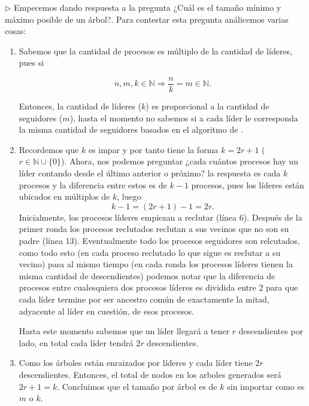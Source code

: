 $\rhd$ Empecemos dando respuesta a la pregunta ¿Cuál es el tamaño mínimo y máximo posible de un árbol?.
Para contestar esta pregunta análicemos varias cosas:
\begin{enumerate}
\item Sabemos que la cantidad de procesos es múltiplo de la cantidad de líderes, pues si
      
      \[n, m, k \in \mathbb{N} \Rightarrow \frac{n}{k} = m \in \mathbb{N}.\]
      
      Entonces, la cantidad de líderes ($k$) es proporcional a la cantidad de seguidores ($m$),
      hasta el momento no sabemos si a cada líder le corresponda la misma cantidad de seguidores
      basados en el algoritmo de .
      
\item Recordemos que $k$ es impar y por tanto tiene la forma $k = 2r + 1$ ($r \in \mathbb{N} \cup \{0\}$).
      Ahora, nos podemos preguntar ¿cada cuántos procesos hay un líder contando desde el último anterior
      o próximo? la respuesta es cada $k$ procesos y la diferencia entre estos es de $k - 1$ procesos,
      pues los líderes están ubicados en múltiplos de $k$, luego
      \[ k - 1 = (2r + 1) - 1 = 2r.\]
      Inicialmente, los procesos líderes empiezan a reclutar (línea 6). Después de la primer ronda
      los procesos reclutados reclutan a sus vecinos que no son su padre (línea 13). Eventualmente
      todo los procesos seguidores son relcutados, como todo esto (en cada proceso reclutado lo que sigue
      es reclutar a su vecino) pasa al mismo tiempo (en cada ronda los procesos líderes tienen la misma
      cantidad de descendientes) podemos notar que la diferencia de procesos entre cualesquiera dos
      procesos líderes es dividida entre $2$ para que cada líder termine por ser ancestro común de
      exactamente la mitad, adyacente al líder en cuestión, de esos procesos.

      Hasta este momento sabemos que un líder llegará a tener $r$ descendientes por lado, en total
      cada líder tendrá $2r$ descendientes.
      
\item Como los árboles están enraizados por líderes y cada líder tiene $2r$ descendientes. Entonces, el
total de nodos en los arboles generados será $2r + 1 = k$. Concluimos que el tamaño por árbol es de $k$
sin importar como es $m$ o $k$.
\end{enumerate}

